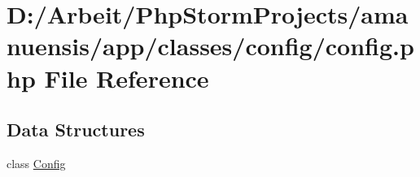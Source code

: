 \hypertarget{config_8php}{}\section{D\+:/\+Arbeit/\+Php\+Storm\+Projects/amanuensis/app/classes/config/config.php File Reference}
\label{config_8php}
\subsection*{Data Structures}
\begin{DoxyCompactItemize}
\item 
class \hyperlink{class_config}{Config}
\end{DoxyCompactItemize}
